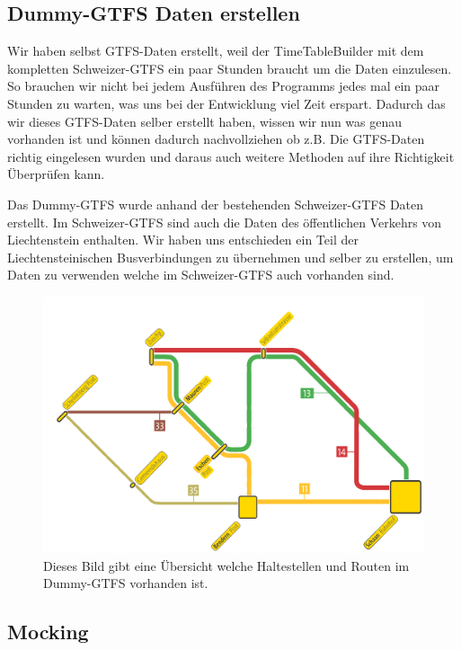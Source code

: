 \subsection{Dummy-GTFS Daten erstellen}
Wir haben selbst GTFS-Daten erstellt, weil der TimeTableBuilder mit dem kompletten Schweizer-GTFS ein paar Stunden braucht um die Daten einzulesen. So brauchen wir nicht bei jedem Ausführen des Programms jedes mal ein paar Stunden zu warten, was uns bei der Entwicklung viel Zeit erspart. Dadurch das wir dieses GTFS-Daten selber erstellt haben, wissen wir nun was genau vorhanden ist und können dadurch nachvollziehen ob z.B. Die GTFS-Daten richtig eingelesen wurden und daraus auch weitere Methoden auf ihre Richtigkeit Überprüfen kann.\newline

Das Dummy-GTFS wurde anhand der bestehenden Schweizer-GTFS Daten erstellt. Im Schweizer-GTFS sind auch die Daten des öffentlichen Verkehrs von Liechtenstein enthalten. Wir haben uns entschieden ein Teil der Liechtensteinischen Busverbindungen zu übernehmen und selber zu erstellen, um Daten zu verwenden welche im Schweizer-GTFS auch vorhanden sind.

\begin{figure}[h]
	\centering
	\includegraphics[width=12cm]{img/LiniennetzDummyGTFS.png}
	\caption{Dieses Bild gibt eine Übersicht welche Haltestellen und Routen im Dummy-GTFS vorhanden ist.}
	\label{fig:DummyGTFS-uebersicht}
\end{figure}




\subsection{Mocking}


